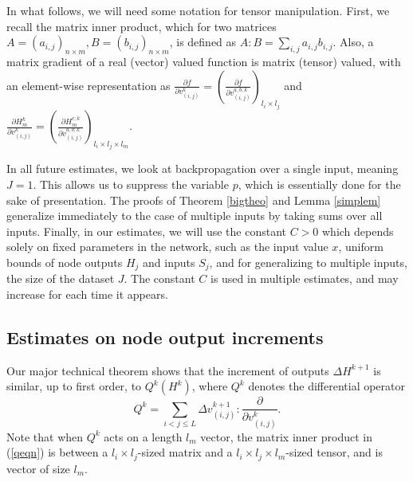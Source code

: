 \documentclass{jcmlatex}
\begin{document}
In what follows, we will need some notation for  tensor manipulation.   First, we recall  the matrix inner product, which for two matrices $A = (a_{i,j})_{n\times m}, B = (b_{i,j})_{n\times
m}$, is defined as $A:B = \sum_{i,j} a_{i,j}b_{i,j}$. Also, a matrix gradient
of a real (vector) valued function is matrix (tensor) valued, with an element-wise
representation as  $\frac{\partial f }{\partial v_{(i,j)}^k} = \left(\frac{\partial
f }{\partial v_{(i,j)}^{a,b;k}}\right)_{l_i\times l_j}$ and $\frac{\partial
H_m^k }{\partial v_{(i,j)}^k}= \left(\frac{\partial H_m^{c;k} }{\partial
v_{(i,j)}^{a,b;k}}\right)_{l_i\times l_j\times l_m}$.

In all future estimates, we look at backpropagation over a single input, meaning $J = 1$. This allows us to suppress the variable $p$, which is essentially done for the sake of presentation.  The proofs of Theorem \ref{bigtheo} and Lemma \ref{simplem} generalize immediately to the case of multiple inputs by taking sums over all inputs. Finally, in our estimates, we will use the constant $C>0$ which depends solely on fixed parameters in the network, such as the input value $x$, uniform bounds of node outputs $H_j$ and inputs $S_j$, and for generalizing to multiple inputs, the size of the dataset $J$. The constant $C$ is used in multiple estimates, and may increase for each time it appears.

\subsection{Estimates on node output increments}

Our  major technical theorem shows that the increment of outputs $\Delta H^{k+1}$   is
similar, up to first order, to $Q^k(H^k)$, where  $Q^k$ denotes the differential operator
\begin{equation}\label{qeqn}
Q^k =\sum_{i<j\le L}  \Delta v_{(i,j)}^{k+1}:\frac{\partial }{\partial v_{(i,j)}^{k}}.
\end{equation}
Note that when $Q^k$ acts on a  length $l_m$ vector, the matrix inner product in (\ref{qeqn})
is between a $l_i \times l_j$-sized matrix and a $l_i\times l_j \times l_m$-sized tensor, and is vector of size $l_m$.
\end{document}
